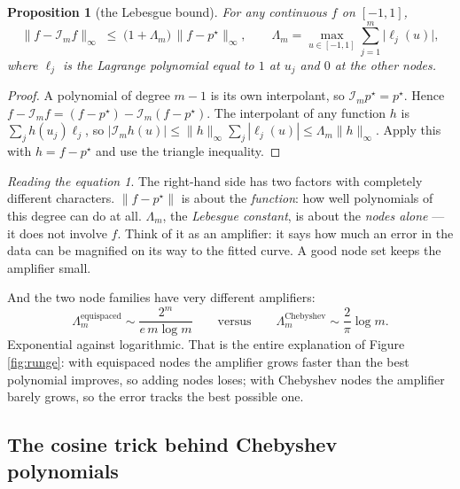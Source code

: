 \documentclass[10pt,a4paper]{article}
\theoremstyle{plain}
\newtheorem{prop}[thm]{Proposition}
\theoremstyle{remark}
\newtheorem*{reading}{Reading the equation}
\begin{document}
\begin{prop}[the Lebesgue bound]
\label{prop:lebesgue}
For any continuous $f$ on $[-1,1]$,
\begin{equation}
  \|f-\mathcal{I}_m f\|_\infty \;\le\; \big(1+\Lambda_m\big)\,\|f-p^\star\|_\infty,
  \qquad
  \Lambda_m = \max_{u\in[-1,1]} \sum_{j=1}^{m} \big|\ell_j(u)\big|,
  \label{eq:lebesgue}
\end{equation}
where $\ell_j$ is the Lagrange polynomial equal to $1$ at $u_j$ and $0$ at the other nodes.
\end{prop}

\begin{proof}
A polynomial of degree $m-1$ is its own interpolant, so $\mathcal{I}_m p^\star = p^\star$.
Hence $f - \mathcal{I}_m f = (f-p^\star) - \mathcal{I}_m(f-p^\star)$. The interpolant of any
function $h$ is $\sum_j h(u_j)\ell_j$, so $|\mathcal{I}_m h(u)| \le \|h\|_\infty \sum_j|\ell_j(u)|
\le \Lambda_m\|h\|_\infty$. Apply this with $h = f-p^\star$ and use the triangle inequality.
\end{proof}

\begin{reading}
The right-hand side has two factors with completely different characters.
$\|f-p^\star\|$ is about the \emph{function}: how well polynomials of this degree can do at
all. $\Lambda_m$, the \emph{Lebesgue constant}, is about the \emph{nodes alone} --- it does
not involve $f$. Think of it as an amplifier: it says how much an error in the data can be
magnified on its way to the fitted curve. A good node set keeps the amplifier small.
\end{reading}

\noindent And the two node families have very different amplifiers:
\begin{equation}
  \Lambda_m^{\text{equispaced}} \sim \frac{2^{m}}{e\,m\log m}
  \qquad\text{versus}\qquad
  \Lambda_m^{\text{Chebyshev}} \sim \frac{2}{\pi}\log m .
\end{equation}
Exponential against logarithmic. That is the entire explanation of Figure \ref{fig:runge}:
with equispaced nodes the amplifier grows faster than the best polynomial improves, so
adding nodes loses; with Chebyshev nodes the amplifier barely grows, so the error tracks the
best possible one.

\subsection{The cosine trick behind Chebyshev polynomials}
\end{document}
